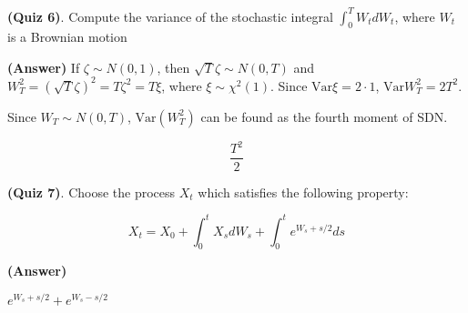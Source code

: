 \documentclass[12pt]{article}
\theoremstyle{nonumberbreak}
\begin{document}
\textbf{(Quiz 6)}. Compute the variance of the stochastic integral $\int_0^TW_t dW_t$, where $W_t$ is a Brownian motion

\textbf{(Answer)} If $\zeta \sim N(0,1)$, then $\sqrt{T} \zeta \sim N(0,T)$ and $W_T^2 = \left( \sqrt{T} \zeta \right)^2 = T \zeta^2 = T\xi$, where $\xi \sim \chi^2(1)$. Since $\mathrm{Var} \xi = 2\cdot 1$, $\mathrm{Var} W_T^2 = 2 T^2$. 

Since $W_T \sim N(0,T)$, $\mathrm{Var} (W_T^2)$ can be found as the fourth moment of SDN. 

$$
\frac{T^2}{2}
$$


\textbf{(Quiz 7)}. Choose the process $X_t$ which satisfies the following property:

$$
X_t = X_0 + \int_0^t X_s d W_s + \int_0^t e^{W_s + s/2} ds
$$

\textbf{(Answer)} 

$e^{W_s + s/2} + e^{W_s - s/2}$
\end{document}

